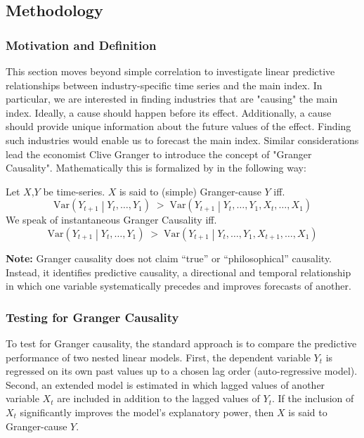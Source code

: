 
\subsection{Methodology}

\subsubsection{Motivation and Definition}
This section moves beyond simple correlation to investigate linear predictive relationships between industry-specific time series and the main index. In particular, we are interested in finding industries that are "causing" the main index. Ideally, a cause should happen before its effect. Additionally, a cause should provide unique information about the future values of the effect. Finding such industries would enable us to forecast the main index. Similar considerations lead the economist Clive Granger to introduce the concept of "Granger Causality". Mathematically this is formalized by \citet{granger1969investigating} in the following way:

\begin{defn}
Let $X$,$Y$ be time-series. $X$ is said to (simple) Granger-cause $Y$ iff.    
\[
\mathrm{Var}\!\left(Y_{t+1}\middle| Y_t,\ldots,Y_1\right) \; > \; \mathrm{Var}\!\left(Y_{t+1}\middle| Y_t,\ldots,Y_1,X_t,\ldots,X_1\right)
\]
We speak of instantaneous Granger Causality iff. \[
\mathrm{Var}\!\left(Y_{t+1}\middle| Y_t,\ldots,Y_1\right) \; > \; \mathrm{Var}\!\left(Y_{t+1}\middle| Y_t,\ldots,Y_1,X_{t+1},\ldots,X_1\right)
\]

\end{defn}

\textbf{Note:} Granger causality does not claim “true” or “philosophical” causality. Instead, it identifies predictive causality, a directional and temporal relationship in which one variable systematically precedes and improves forecasts of another.

\subsubsection{Testing for Granger Causality}
To test for Granger causality, the standard approach is to compare the predictive performance of two nested linear models. First, the dependent variable $Y_t$ is regressed on its own past values up to a chosen lag order (auto-regressive model). Second, an extended model is estimated in which lagged values of another variable $X_t$ are included in addition to the lagged values of $Y_t$. If the inclusion of $X_t$ significantly improves the model’s explanatory power, then $X$ is said to Granger-cause $Y$.


